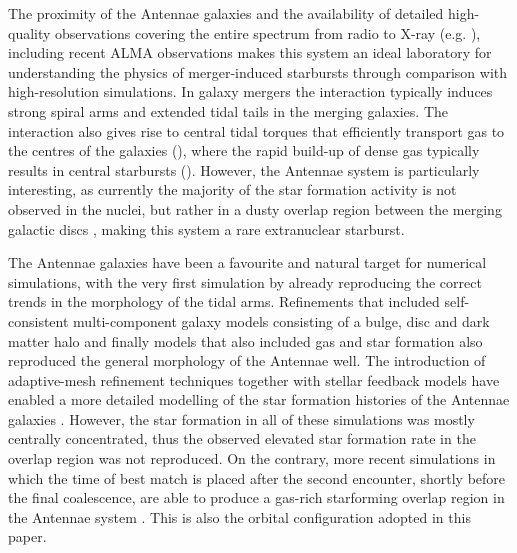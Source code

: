 \documentclass[a4paper,fleqn,usenatbib]{mnras}
\begin{document}
The proximity of the Antennae galaxies and the availability of detailed high-quality observations covering the entire
spectrum from radio to X-ray (e.g. \citealt{1999AJ....118.1551W,2001ApJ...554.1035F,2004ApJS..154..193W,2005ApJ...619L..87H,2006ApJS..166..211Z,2015ApJ...815..103B}), 
including recent ALMA observations \citep{2012A&A...538L...9H,2014ApJ...795..156W} makes this system an ideal laboratory for 
understanding the physics of merger-induced starbursts through comparison with high-resolution simulations. In galaxy mergers the interaction
typically induces strong spiral arms and extended tidal tails in the merging galaxies. The interaction also gives rise to central tidal torques that 
efficiently transport gas to the centres of the galaxies (\citealt{1991ApJ...370L..65B}), where the rapid build-up of dense gas 
typically results in 
central starbursts (\citealt{1996ApJ...464..641M}). However, the Antennae system is particularly interesting, as currently the majority of the star formation 
activity is not observed in the nuclei, but rather in a dusty overlap region between the merging galactic 
discs \citep{1998A&A...333L...1M,2004ApJS..154..193W,2012ApJ...745...65U}, making this system a rare extranuclear starburst. 

The Antennae galaxies have been a favourite and natural target for numerical simulations, with the very first simulation by \citet{1972ApJ...178..623T} already 
reproducing the correct trends in the morphology of the tidal arms. Refinements that included self-consistent multi-component galaxy models consisting 
of a bulge, disc and dark matter halo \citep{1988ApJ...331..699B} and finally models that also included gas and star formation 
\citep{1993ApJ...418...82M} also reproduced the general morphology 
of the Antennae well. The introduction of adaptive-mesh refinement techniques together 
with stellar feedback models have enabled a more detailed modelling of the
star formation histories of the Antennae galaxies \citep{2010ApJ...720L.149T,2015MNRAS.446.2038R}.    
However, the star formation in all of these simulations was mostly centrally concentrated, thus the observed 
elevated star formation rate in the overlap region was not reproduced. On the contrary, more recent simulations in which the time of 
best match is placed after the second encounter, shortly before the 
final coalescence, are able to produce a gas-rich starforming overlap region in the Antennae system
\citep{2008AN....329.1042K,2010ApJ...715L..88K,2011ApJ...734...11K,2013MNRAS.434..696K,2010ApJ...716.1438K}. This is also the orbital configuration adopted 
in this paper. 
\end{document}
